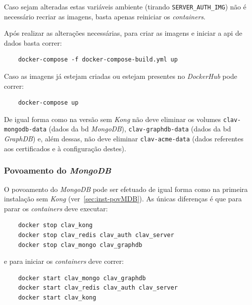 Caso sejam alteradas estas variáveis ambiente (tirando \texttt{SERVER\_AUTH\_IMG}) não é necessário recriar as imagens, basta apenas reiniciar os \textit{containers}.

Após realizar as alterações necessárias, para criar as imagens e iniciar a \acrshort{api} de dados basta correr:

\footnotesize
\begin{verbatim}
    docker-compose -f docker-compose-build.yml up
\end{verbatim}
\normalsize

Caso as imagens já estejam criadas ou estejam presentes no \textit{DockerHub} pode correr:

\footnotesize
\begin{verbatim}
    docker-compose up
\end{verbatim}
\normalsize

De igual forma como na versão sem \textit{Kong} não deve eliminar os volumes \texttt{clav-mongodb-data} (dados da \acrshort{bd} \textit{MongoDB}), \texttt{clav-graphdb-data} (dados da \acrshort{bd} \textit{GraphDB}) e, além dessas, não deve eliminar \texttt{clav-acme-data} (dados referentes aos certificados e à configuração destes).

\subsubsection{Povoamento do \textit{MongoDB}}

O povoamento do \textit{MongoDB} pode ser efetuado de igual forma como na primeira instalação sem \textit{Kong} (ver~\ref{sec:inst-povMDB}). As únicas diferenças é que para parar os \textit{containers} deve executar:

\footnotesize
\begin{verbatim}
    docker stop clav_kong
    docker stop clav_redis clav_auth clav_server
    docker stop clav_mongo clav_graphdb
    \end{verbatim}
\normalsize
\vspace{-0.5cm}

e para iniciar os \textit{containers} deve correr:

\footnotesize
    \begin{verbatim}
    docker start clav_mongo clav_graphdb
    docker start clav_redis clav_auth clav_server
    docker start clav_kong
    \end{verbatim}
\normalsize
\vspace{-0.5cm}

